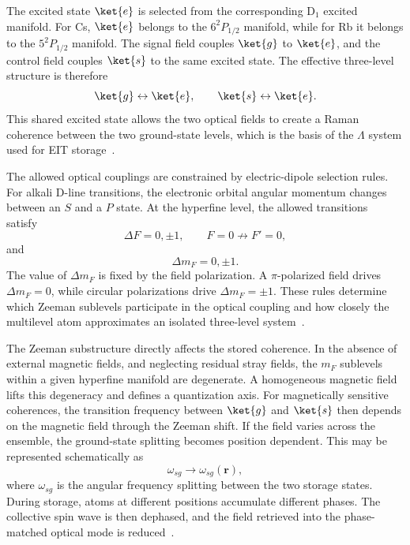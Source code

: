 The excited state \(\ket{e}\) is selected from the corresponding D$_1$ excited manifold. For Cs, \(\ket{e}\) belongs to the \(6^2P_{1/2}\) manifold, while for Rb it belongs to the \(5^2P_{1/2}\) manifold. The signal field couples \(\ket{g}\) to \(\ket{e}\), and the control field couples \(\ket{s}\) to the same excited state. The effective three-level structure is therefore
\begin{equation}
    \ket{g} \leftrightarrow \ket{e},
    \qquad
    \ket{s} \leftrightarrow \ket{e}.
    \label{eq:lambda_transitions}
\end{equation}
This shared excited state allows the two optical fields to create a Raman coherence between the two ground-state levels, which is the basis of the $\Lambda$ system used for EIT storage~\cite{Apgteitiav_FinkelsteinEtAl_2023,Oqmboeit_MaEtAl_2017}.

The allowed optical couplings are constrained by electric-dipole selection rules. For alkali D-line transitions, the electronic orbital angular momentum changes between an \(S\) and a \(P\) state. At the hyperfine level, the allowed transitions satisfy~\cite{Steck_CsDLine,Steck_Rb87DLine}
\begin{equation}
    \Delta F = 0,\pm1,
    \qquad
    F=0 \not\rightarrow F'=0,
    \label{eq:selection_rule_F}
\end{equation}
and
\begin{equation}
    \Delta m_F = 0,\pm1.
    \label{eq:selection_rule_mF}
\end{equation}
The value of \(\Delta m_F\) is fixed by the field polarization. A \(\pi\)-polarized field drives \(\Delta m_F=0\), while circular polarizations drive \(\Delta m_F=\pm1\). These rules determine which Zeeman sublevels participate in the optical coupling and how closely the multilevel atom approximates an isolated three-level system~\cite{Steck_CsDLine,Steck_Rb87DLine,Apgteitiav_FinkelsteinEtAl_2023}.

The Zeeman substructure directly affects the stored coherence. In the absence of external magnetic fields, and neglecting residual stray fields, the \(m_F\) sublevels within a given hyperfine manifold are degenerate. A homogeneous magnetic field lifts this degeneracy and defines a quantization axis. For magnetically sensitive coherences, the transition frequency between \(\ket{g}\) and \(\ket{s}\) then depends on the magnetic field through the Zeeman shift. If the field varies across the ensemble, the ground-state splitting becomes position dependent. This may be represented schematically as
\begin{equation}
    \omega_{sg} \rightarrow \omega_{sg}(\mathbf r),
    \label{eq:position_dependent_splitting}
\end{equation}
where \(\omega_{sg}\) is the angular frequency splitting between the two storage states. During storage, atoms at different positions accumulate different phases. The collective spin wave is then dephased, and the field retrieved into the phase-matched optical mode is reduced~\cite{Apgteitiav_FinkelsteinEtAl_2023,Oqmboeit_MaEtAl_2017}.

